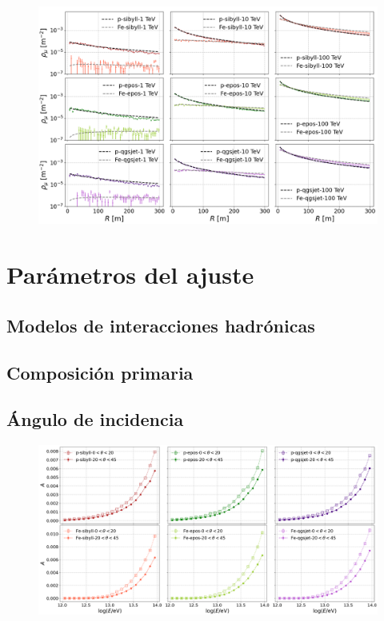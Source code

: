 \documentclass[12pt,letterpaper]{report}
\begin{document}
		\begin{figure}[H] \label{fig:lateraldist_wfits}
		\includegraphics[width=\textwidth]{Figuras/lateraldist_wfits}
		\end{figure}
		
\section{Par\'ametros del ajuste}

	\subsection{Modelos de interacciones hadr\'onicas}
	\subsection{Composici\'on primaria}
	\subsection{\'Angulo de incidencia}
		\begin{figure}[H] \label{fig:theta_nkgA}
		\includegraphics[width=\textwidth]{Figuras/theta_nkgA}
		\end{figure}
		
\end{document}
